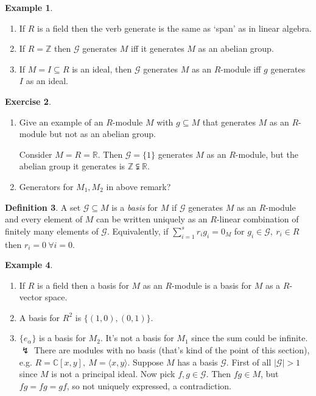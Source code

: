 \documentclass[a4paper]{article}
\theoremstyle{definition}
\newtheorem{defn}{Definition}[subsection]
\newtheorem{example}[defn]{Example}
\newtheorem{exe}[defn]{Exercise}
\begin{document}
\begin{example}
\begin{enumerate}
\item If $R$ is a field then the verb generate is the same as `span' as in linear algebra.
\item If $R=\mathbb Z$ then $\mathcal G$ generates $M$ iff it generates $M$ as an abelian group.
\item If $M=I\subseteq R$ is an ideal, then $\mathcal G$ generates $M$ as an $R$-module iff $g$ generates $I$ as an ideal.
\end{enumerate}
\end{example}

\begin{exe}
\begin{enumerate}
\item Give an example of an $R$-module $M$ with $g\subseteq M$ that generates $M$ as an $R$-module but not as an abelian group.

Consider $M=R=\mathbb R$. Then $\mathcal G=\{1\}$ generates $M$ as an $R$-module, but the abelian group it generates is $\mathbb Z\subsetneqq \mathbb R$.
\item Generators for $M_1,M_2$ in above remark?
\end{enumerate}
\end{exe}

\begin{defn}
A set $\mathcal G\subseteq M$ is a \textit{basis} for $M$ if $\mathcal G$ generates $M$ as an $R$-module and every element of $M$ can be written uniquely as an $R$-linear combination of finitely many elements of $\mathcal G$. Equivalently, if $\sum_{i=1}^s r_i g_i=0_M$ for $g_i\in \mathcal G,\ r_i\in R$ then $r_i=0 \ \forall i=0$.
\end{defn}

\begin{example}
\begin{enumerate}
\item If $R$ is a field then a basis for $M$ as an $R$-module is a basis for $M$ as a $R$-vector space.
\item A basis for $R^2$ is $\{(1,0),(0,1)\}$.
\item $\{e_\alpha\}$ is a basis for $M_2$. It's not a basis for $M_1$ since the sum could be infinite. $\lightning$ There are modules with no basis (that's kind of the point of this section), e.g. $R=\mathbb C[x,y],\ M=\langle x,y\rangle$. Suppose $M$ has a basis $\mathcal G$. First of all $|\mathcal G|>1$ since $M$ is not a principal ideal. Now pick $f,g\in \mathcal G$. Then $fg\in M$, but $fg=fg=gf$, so not uniquely expressed, a contradiction.
\end{enumerate}
\end{example}
\end{document}

